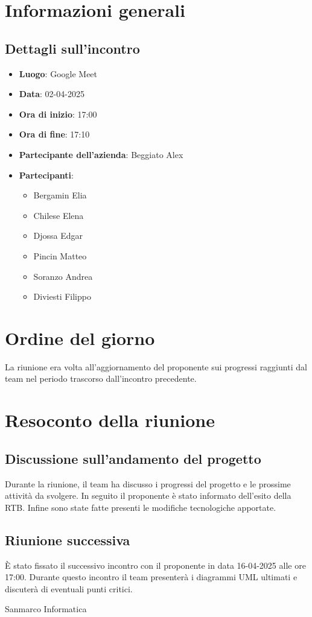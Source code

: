 \section{Informazioni generali}
\subsection{Dettagli sull'incontro}
\begin{itemize}
    \item \textbf{Luogo}: Google Meet
    \item \textbf{Data}: 02-04-2025
    \item \textbf{Ora di inizio}: 17:00
    \item \textbf{Ora di fine}: 17:10
    \item \textbf{Partecipante dell'azienda}: Beggiato Alex
    \item \textbf{Partecipanti}:
    \begin{itemize}
        \item Bergamin Elia
        \item Chilese Elena
        \item Djossa Edgar
        \item Pincin Matteo 
        \item Soranzo Andrea
        \item Diviesti Filippo  
    \end{itemize}
\end{itemize}

\section{Ordine del giorno}
La riunione era volta all'aggiornamento del proponente sui progressi raggiunti dal team nel periodo trascorso dall'incontro precedente.

\section{Resoconto della riunione}
\subsection{Discussione sull'andamento del progetto}
Durante la riunione, il team ha discusso i progressi del progetto e le prossime attività da svolgere. In seguito il proponente è stato informato dell'esito della RTB. Infine sono state fatte presenti le
modifiche tecnologiche apportate.

\subsection{Riunione successiva}
È stato fissato il successivo incontro con il proponente in data 16-04-2025 alle ore 17:00.
Durante questo incontro il team presenterà i diagrammi UML ultimati e discuterà di eventuali punti critici.

\hfill\signature{Approvazione esterna}{Sanmarco Informatica}